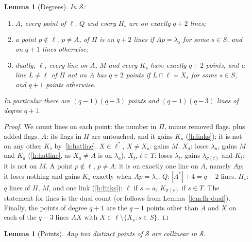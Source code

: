\documentclass[11pt]{amsart}
\newtheorem{lemma}[theorem]{Lemma}
\theoremstyle{definition}
\theoremstyle{remark}
\newcommand{\cS}{\mathcal{S}}
\newcommand{\lam}{\lambda}
\begin{document}
\begin{lemma}[Degrees]\label{lem:fh-deg}
In $\cS$:
\begin{enumerate}[label=\textup{(\roman*)}]
\item $A$, every point of $\ell$, $Q$ and every $H_s$ are on exactly $q+2$ lines;
\item a point $p\notin\ell$, $p\ne A$, of $\Pi$ is on $q+2$ lines if $Ap=\lam_s$ for some $s\in S$, and on $q+1$ lines otherwise;
\item dually, $\ell$, every line on $A$, $M$ and every $K_s$ have exactly $q+2$ points, and a line $L\ne\ell$ of $\Pi$ not on $A$ has $q+2$ points if $L\cap\ell=X_s$ for some $s\in S$, and $q+1$ points otherwise.
\end{enumerate}
In particular there are $(q-1)(q-3)$ points and $(q-1)(q-3)$ lines of degree $q+1$.
\end{lemma}

\begin{proof}
We count lines on each point: the number in $\Pi$, minus removed flags, plus added flags.
$A$: its flags in $\Pi$ are untouched, and it gains $K_a$ (\ref{h:links}); it is not on any other $K_s$ by~\ref{h:hatline}.
$X\in\ell^*$, $X\ne X_a$: gains $M$.
$X_a$: loses $\lam_a$, gains $M$ and $K_a$ (\ref{h:hatline}, as $X_a\ne A$ is on $\lam_a$).
$X_t$, $t\in T$: loses $\lam_t$, gains $\lam_{\sigma(t)}$ and $K_t$; it is not on $M$.
A point $p\notin\ell$, $p\ne A$: it is on exactly one line on $A$, namely $Ap$; it loses nothing and gains $K_s$ exactly when $Ap=\lam_s$.
$Q$: $|\Lambda^*|+4=q+2$ lines.
$H_s$: $q$ lines of $\Pi$, $M$, and one link (\ref{h:links}): $\ell$ if $s=a$, $K_{\sigma(s)}$ if $s\in T$.
The statement for lines is the dual count (or follows from Lemma~\ref{lem:fh-dual}). Finally, the points of degree $q+1$ are the $q-1$ points other than $A$ and $X$ on each of the $q-3$ lines $AX$ with $X\in\ell\setminus\{X_s:s\in S\}$.
\end{proof}

\begin{lemma}[Points]\label{lem:fh-points}
Any two distinct points of $\cS$ are collinear in $\cS$.
\end{lemma}
\end{document}
